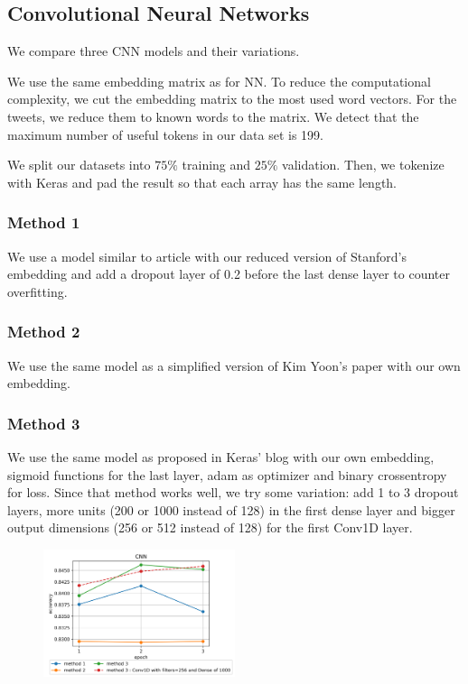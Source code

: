 \documentclass[11pt, a4paper, twocolumn]{article}
\begin{document}
\subsection{Convolutional Neural Networks}
We compare three CNN models and their variations.

We use the same embedding matrix as for NN\cite{glovepaper, gloveembedding}. To reduce the computational complexity, we cut the embedding matrix to the most used word vectors. For the tweets, we reduce them to known words to the matrix. We detect that the maximum number of useful tokens in our data set is 199\label{199}.

We split our datasets into $75\%$ training and $25\%$ validation. Then, we tokenize with Keras and pad the result so that each array has the same length.

\subsubsection{Method 1}
We use a model similar to article\cite{cnn1} with our reduced version of Stanford's embedding and add a dropout layer of 0.2 before the last dense layer to counter overfitting.

\subsubsection{Method 2}
We use the same model as a simplified version\cite{cnn2} of Kim Yoon's paper\cite{kimyoonpaper} with our own embedding.

\subsubsection{Method 3}
We use the same model as proposed in Keras' blog\cite{cnn3} with our own embedding, sigmoid functions for the last layer, adam as optimizer and binary crossentropy for loss.
Since that method works well, we try some variation: add 1 to 3 dropout layers, more units (200 or 1000 instead of 128) in the first dense layer and bigger output dimensions (256 or 512 instead of 128) for the first Conv1D layer. 

\begin{figure}[h]
	\centering
	\includegraphics[width=0.5\textwidth]{../plots/cnn.png}
\end{figure}
\end{document}
